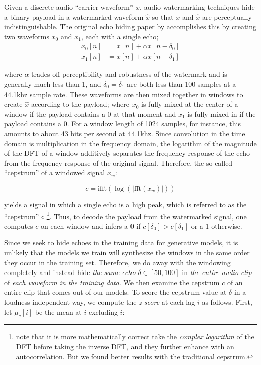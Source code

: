 \documentclass[letterpaper]{article} %
\begin{document}
Given a discrete audio ``carrier waveform'' $x$, audio watermarking techniques hide a binary payload in a watermarked waveform $\hat{x}$ so that $x$ and $\hat{x}$ are perceptually indistinguishable.  The original echo hiding paper by \cite{gruhl1996echo} accomplishes this by creating two waveforms $x_0$ and $x_1$, each with a single echo; 
\begin{equation}
    \begin{aligned}
        x_0[n] &= x[n] + \alpha x[n - \delta_0] \\
        x_1[n] &= x[n] + \alpha x[n - \delta_1]
    \end{aligned}
\end{equation}

 where $\alpha$ trades off perceptibility and robustness of the watermark and is generally much less than 1, and $\delta_0 = \delta_1$ are both less than 100 samples at a 44.1khz sample rate.  These waveforms are then mixed together in windows to create $\hat{x}$ according to the payload; where $x_0$ is fully mixed at the center of a window if the payload contains a 0 at that moment and $x_1$ is fully mixed in if the payload contains a 0.  For a window length of 1024 samples, for instance, this amounts to about 43 bits per second at 44.1khz.  Since convolution in the time domain is multiplication in the frequency domain, the logarithm of the magnitude of the DFT of a window additively separates the frequency response of the echo from the frequency response of the original signal.  Therefore, the so-called ``cepstrum'' of a windowed signal $x_w$:
 
\begin{equation}
    \label{eq:cepstrum}
    c = \text{ifft} ( \log ( | \text{fft} (x_w) | ) )
\end{equation}
 
yields a signal in which a single echo is a high peak, which is referred to as the ``cepstrum'' $c$ \footnote{\cite{gruhl1996echo} note that it is more mathematically correct take the {\em complex logarithm} of the DFT before taking the inverse DFT, and they further enhance with an autocorrelation.  But we found better results with the traditional cepstrum.}.  Thus, to decode the payload from the watermarked signal, one computes $c$ on each window and infers a 0 if $c[\delta_0] > c[\delta_1]$ or a 1 otherwise.

Since we seek to hide echoes in the training data for generative models, it is unlikely that the models we train will synthesize the windows in the same order they occur in the training set.  Therefore, we do away with the windowing completely and instead hide {\em the same echo} $\delta \in [50, 100]$ in {\em the entire audio clip} of {\em each waveform in the training data}.  We then examine the cepstrum $c$ of an entire clip that comes out of our models.  To score the cepstrum value at $\delta$ in a loudness-independent way, we compute the {\em z-score} at each lag $i$ as follows.  First, let $\mu_c[i]$ be the mean at $i$ excluding $i$:
\end{document}
